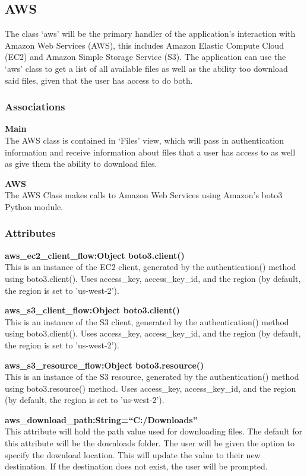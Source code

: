\subsection{AWS}
The class `aws' will be the primary handler of the application's interaction with Amazon Web Services (AWS),
this includes Amazon Elastic Compute Cloud (EC2) and Amazon Simple Storage Service (S3). The application
can use the `aws' class to get a list of all available files as well as the ability too download said files, 
given that the user has access to do both.

\subsubsection{Associations}
\textbf{Main} \\
	The AWS class is contained in `Files' view, which will pass in authentication information and receive information about files 
	that a user has access to as well as give them the ability to download files.

\textbf{AWS} \\
	The AWS Class makes calls to Amazon Web Services using Amazon's boto3 Python module.

\subsubsection{Attributes}
\textbf{aws\_ec2\_client\_flow:Object boto3.client()} \\
    This is an instance of the EC2 client, generated by the authentication() method using boto3.client(). Uses access\_key, access\_key\_id, and the region (by default, the region is set to 'us-west-2'). 

\textbf{aws\_s3\_client\_flow:Object boto3.client()} \\
    This is an instance of the S3 client, generated by the authentication() method using boto3.client(). Uses access\_key, access\_key\_id, and the region (by default, the region is set to 'us-west-2').

\textbf{aws\_s3\_resource\_flow:Object boto3.resource()} \\
    This is an instance of the S3 resource, generated by the authentication() method using boto3.resource() method. Uses access\_key, access\_key\_id, and the region (by default, the region is set to 'us-west-2').

\textbf{aws\_download\_path:String=``C:/Downloads''} \\
    This attribute will hold the path value used for downloading files. The default for this attribute will be the downloads folder. The user 
    will be given the option to specify the download location. This will update the value to their new destination. If the destination does 
    not exist, the user will be prompted.

